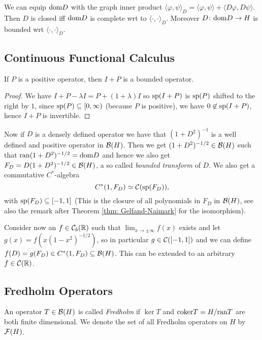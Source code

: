 \noindent We can equip $\dom D$ with the graph inner product $\langle\varphi,\psi\rangle_D=\langle\varphi,\psi\rangle+\langle D\varphi,D\psi\rangle$. Then $D$ is closed iff $\dom D$ is complete wrt to $\langle\cdot,\cdot\rangle_D$. Moreover $D\colon\dom D\to H$ is bounded wrt $\langle\cdot,\cdot\rangle_D$. 

\subsection{Continuous Functional Calculus}
\begin{lemma}
 If $P$ is a positive operator, then $I+P$ is a bounded operator.
\end{lemma}
\begin{proof}
 We have $I+P-\lambda I=P+(1+\lambda) I$ so $\sp(I+P)$ is $\sp(P)$ shifted to the right by $1$, since $\sp(P)\subseteq[0,\infty)$ (because $P$ is positive), we have $0\not\in\sp(I+P)$, hence $I+P$ is invertible.
\end{proof}



\noindent Now if $D$ is a densely defined operator we have that $(1+D^2)^{-1}$ is a well defined and positive operator in $\B(H)$. Then we get $(1+D^2)^{-1/2}\in\B(H)$ such that $\ran(1+D^2)^{-1/2}=\dom D$ and hence we also get $F_D=D(1+D^2)^{-1/2}\in\B(H)$, a so called \emph{bounded transform} of $D$. We also get a commutative $C^\ast$-algebra $$C^\ast(1,F_D)\simeq\Co(\sp(F_D)),$$ with $\sp(F_D)\subseteq [-1,1]$ (This is the closure of all polynomials in $F_D$ in $\B(H)$, see also the remark after Theorem \eqref{thm: Gelfand-Naimark} for the isomorphism). 

\noindent Consider now an $f\in\Co_b(\Bbb R)$ such that $\lim_{x\to\pm\infty}f(x)$ exists and let $g(x)=f(x(1-x^2)^{-1/2})$, so in particular $g\in\Co([-1,1])$ and we can define $f(D)=g(F_D)\in C^\ast(1,F_D)\subseteq\B(H)$. This can be extended to an arbitrary $f\in\Co(\R)$. 

\subsection{Fredholm Operators}
\begin{definition}
 An operator $T\in\B(H)$ is called \emph{Fredholm} if $\ker T$ and $\coker T=H/\ran T$ are both finite dimensional. We denote the set of all Fredholm operators on $H$ by $\F(H)$.
\end{definition}

